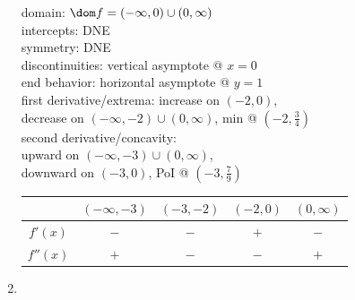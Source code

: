 \documentclass{book}
\begin{document}
\begin{appendices}
\begin{enumerate}[!HW!]
\begin{multicols}{2}
domain: $\dom f = (-\infty,0)\cup(0,\infty)$\\
intercepts: DNE\\
symmetry:  DNE \\ 
discontinuities: vertical asymptote @ $x=0$\\
end behavior: horizontal asymptote @ $y=1$\\ 
first derivative/extrema: increase on $(-2,0)$,\\ decrease on $(-\infty,-2)\cup (0,\infty)$, min @ $\left(-2,\frac{3}{4}\right)$ \\
second derivative/concavity:\\ upward on $(-\infty,-3)\cup(0,\infty)$,\\ downward on $(-3, 0)$, PoI @ $\left(-3,\frac{7}{9}\right)$ \vspace{-15pt}
\begin{center}
\begin{tabular}{c|c|c|c|c}
 & $(-\infty, -3)$ & $(-3, -2)$ & $(-2, 0)$ & $(0,\infty)$ \\ \hline
$f'(x)$ & $-$ & $-$ & $+$ & $-$ \\ 
$f''(x)$ & $+$ & $-$ & $-$ & $+$\\ 
\end{tabular}
\end{center} 
\end{multicols}\pagebreak

\item \mbox{}\vspace{-25pt}

\begin{multicols}{2}
\columnbreak
 

\end{multicols}
\end{enumerate}
\end{appendices}
\end{document}
